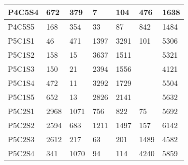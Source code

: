 \begin{longtable}{lllllll}
\multicolumn{1}{|l|}{P4C5S4} & \multicolumn{1}{l|}{672} & \multicolumn{1}{l|}{379} & \multicolumn{1}{l|}{7} & \multicolumn{1}{l|}{104} & \multicolumn{1}{l|}{476} & \multicolumn{1}{l|}{1638} \\ \hline
\multicolumn{1}{|l|}{P4C5S5} & \multicolumn{1}{l|}{168} & \multicolumn{1}{l|}{354} & \multicolumn{1}{l|}{33} & \multicolumn{1}{l|}{87} & \multicolumn{1}{l|}{842} & \multicolumn{1}{l|}{1484} \\ \hline
\multicolumn{1}{|l|}{P5C1S1} & \multicolumn{1}{l|}{46} & \multicolumn{1}{l|}{471} & \multicolumn{1}{l|}{1397} & \multicolumn{1}{l|}{3291} & \multicolumn{1}{l|}{101} & \multicolumn{1}{l|}{5306} \\ \hline
\multicolumn{1}{|l|}{P5C1S2} & \multicolumn{1}{l|}{158} & \multicolumn{1}{l|}{15} & \multicolumn{1}{l|}{3637} & \multicolumn{1}{l|}{1511} & \multicolumn{1}{l|}{} & \multicolumn{1}{l|}{5321} \\ \hline
\multicolumn{1}{|l|}{P5C1S3} & \multicolumn{1}{l|}{150} & \multicolumn{1}{l|}{21} & \multicolumn{1}{l|}{2394} & \multicolumn{1}{l|}{1556} & \multicolumn{1}{l|}{} & \multicolumn{1}{l|}{4121} \\ \hline
\multicolumn{1}{|l|}{P5C1S4} & \multicolumn{1}{l|}{472} & \multicolumn{1}{l|}{11} & \multicolumn{1}{l|}{3292} & \multicolumn{1}{l|}{1729} & \multicolumn{1}{l|}{} & \multicolumn{1}{l|}{5504} \\ \hline
\multicolumn{1}{|l|}{P5C1S5} & \multicolumn{1}{l|}{652} & \multicolumn{1}{l|}{13} & \multicolumn{1}{l|}{2826} & \multicolumn{1}{l|}{2141} & \multicolumn{1}{l|}{} & \multicolumn{1}{l|}{5632} \\ \hline
\multicolumn{1}{|l|}{P5C2S1} & \multicolumn{1}{l|}{2968} & \multicolumn{1}{l|}{1071} & \multicolumn{1}{l|}{756} & \multicolumn{1}{l|}{822} & \multicolumn{1}{l|}{75} & \multicolumn{1}{l|}{5692} \\ \hline
\multicolumn{1}{|l|}{P5C2S2} & \multicolumn{1}{l|}{2594} & \multicolumn{1}{l|}{683} & \multicolumn{1}{l|}{1211} & \multicolumn{1}{l|}{1497} & \multicolumn{1}{l|}{157} & \multicolumn{1}{l|}{6142} \\ \hline
\multicolumn{1}{|l|}{P5C2S3} & \multicolumn{1}{l|}{2612} & \multicolumn{1}{l|}{217} & \multicolumn{1}{l|}{63} & \multicolumn{1}{l|}{201} & \multicolumn{1}{l|}{1489} & \multicolumn{1}{l|}{4582} \\ \hline
\multicolumn{1}{|l|}{P5C2S4} & \multicolumn{1}{l|}{341} & \multicolumn{1}{l|}{1070} & \multicolumn{1}{l|}{94} & \multicolumn{1}{l|}{114} & \multicolumn{1}{l|}{4240} & \multicolumn{1}{l|}{5859} \\ \hline

\end{longtable}
